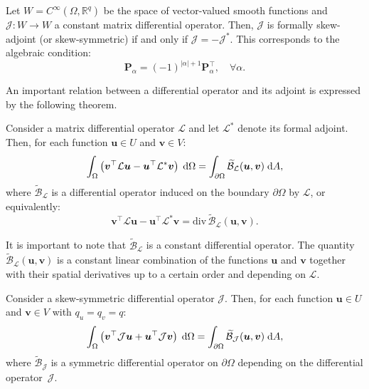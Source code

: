 \begin{definition}
	\label{def:skewOp}
	Let $W = C^{\infty}(\Omega, \mathbb{R}^{q})$ be the space of vector-valued smooth functions and $\mathcal{J}: W \rightarrow W$ a constant matrix differential operator. Then, $\mathcal{J}$ is formally skew-adjoint (or skew-symmetric) if and only if $\mathcal{J} = -\mathcal{J}^*$. This corresponds to the algebraic condition:
	\begin{equation}
	\bm{P}_{\alpha} = (-1)^{|\alpha| + 1} \bm{P}_{\alpha}^\top, \quad \forall \alpha.
	\end{equation}
\end{definition}
An important relation between a differential operator and
its adjoint is expressed by the following theorem.
\begin{theorem}
	Consider a matrix differential operator $\mathcal{L}$ and let $\mathcal{L}^*$ denote its formal adjoint. Then, for each function $\bm{u} \in {U}$ and $\bm{v} \in {V}$:
	\begin{equation}
	\int_{\Omega} \left( \bm{v}^\top \mathcal{L} \bm{u} - \bm{u}^\top \mathcal{L}^* \bm{v}\right) \d\Omega= \int_{\partial \Omega} \widetilde{\mathcal{B}}_{\mathcal{L}}(\bm{u}, \bm{v}) \d{A},
	\end{equation}
	where $\widetilde{\mathcal{B}}_{\mathcal{L}}$ is a differential operator induced on the boundary $\partial\Omega$ by $\mathcal{L}$, or equivalently:
	\begin{equation}
	\bm{v}^\top \mathcal{L} \bm{u} - \bm{u}^\top \mathcal{L}^* \bm{v} = \mathrm{div} \, \widetilde{\mathcal{B}}_{\mathcal{L}}(\bm{u}, \bm{v}).
	\end{equation}
\end{theorem}
It is important to note that $\widetilde{\mathcal{B}}_{\mathcal{L}}$ is a constant differential operator. The quantity $\widetilde{\mathcal{B}}_{\mathcal{L}}(\bm{u}, \bm{v})$ is a constant linear combination of the functions $\bm{u}$ and $\bm{v}$ together with their spatial derivatives up to a certain order and depending on $\mathcal{L}$.
\begin{corollary}
	Consider a skew-symmetric differential operator $\mathcal{J}$. Then, for each function $\bm{u} \in {U}$ and $\bm{v} \in {V}$ with $q_u = q_v = q$:
	\begin{equation}
	\int_{\Omega} \left( \bm{v}^\top \mathcal{J} \bm{u} + \bm{u}^\top \mathcal{J} \bm{v}\right) \d\Omega= \int_{\partial \Omega} \widetilde{\mathcal{B}}_{\mathcal{J}}(\bm{u}, \bm{v}) \d{A},
	\end{equation}
	where $\widetilde{\mathcal{B}}_{\mathcal{J}}$ is a symmetric differential operator on $\partial\Omega$ depending on the differential operator~$\mathcal{J}$.
\end{corollary}

